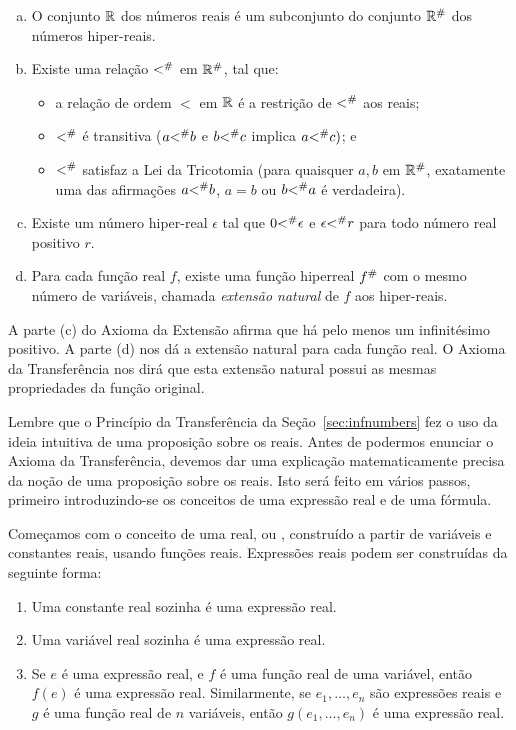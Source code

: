 \documentclass{svmono}
\begin{document}
\begin{enumerate}[(a)]
\item O conjunto $\mathbb{R}$ dos números reais é um subconjunto do conjunto
      ${\mathbb{R}}^\#$ dos números hiper-reais.
\item Existe uma relação ${<}^\#$ em ${\mathbb{R}}^\#$, tal que:
      \begin{itemize}
      \item a relação de ordem $<$ em $\mathbb{R}$ é a restrição de ${<}^\#$
            aos reais;
      \item ${<}^\#$ é transitiva ($a {<}^\# b$ e $b {<}^\# c$ implica $a {<}^\# c)$; e
      \item ${<}^\#$ satisfaz a Lei da Tricotomia (para quaisquer $a,b$ em ${\mathbb{R}}^\#$, exatamente uma das afirmações $a {<}^\# b$, $a = b$ ou $b {<}^\# a$ é verdadeira).
      \end{itemize}
\item Existe um número hiper-real $\epsilon$ tal que $0 {<}^\# \epsilon$ e
      $\epsilon {<}^\# r$ para todo número real positivo $r$.
\item Para cada função real $f$, existe uma função hiperreal ${f}^\#$
      com o mesmo número de variáveis, chamada \emph{extensão natural}
      de $f$ aos hiper-reais.
\end{enumerate}

A parte (c) do Axioma da Extensão afirma que há pelo menos um infinitésimo
positivo. A parte (d) nos dá a extensão natural para cada função real.
O Axioma da Transferência nos dirá que esta extensão natural possui as
mesmas propriedades da função original.

Lembre que o Princípio da Transferência da Seção~\ref{sec:infnumbers} fez
o uso da ideia intuitiva de uma proposição sobre os reais. Antes de podermos
enunciar o Axioma da Transferência, devemos dar uma explicação matematicamente
precisa da noção de uma proposição sobre os reais. Isto será feito em
vários passos, primeiro introduzindo-se os conceitos de uma expressão
real e de uma fórmula.

Começamos com o conceito de uma  real, ou ,
construído a partir de variáveis e constantes reais, usando funções reais.
Expressões reais podem ser construídas da seguinte forma:
\begin{enumerate}[(1)]
\item Uma constante real sozinha é uma expressão real.
\item Uma variável real sozinha é uma expressão real.
\item Se $e$ é uma expressão real, e $f$ é uma função real de uma variável,
      então $f(e)$ é uma expressão real. Similarmente, se $e_1, \ldots, e_n$
      são expressões reais e $g$ é uma função real de $n$ variáveis, então
      $g(e_1, \ldots, e_n)$ é uma expressão real.
\end{enumerate}
\end{document}
